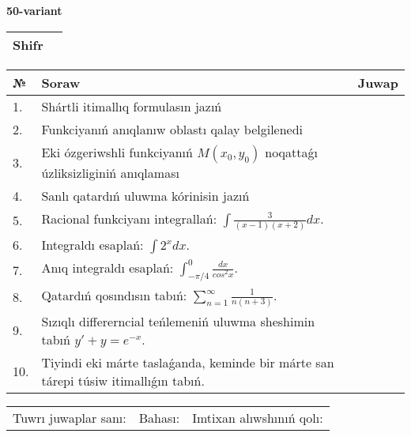 \documentclass{article}
\begin{document}
  \egroup
  
  \newpage
  
  
  \textbf{50-variant}\\
  
  \bgroup
  \def\arraystretch{1.6} %
  
  \begin{tabular}{|m{5.7cm}|m{9.5cm}|}
  \hline
  Shifr & \\
  \hline
  \end{tabular}
  
  \vspace{1cm}
  
  \begin{tabular}{|m{0.7cm}|m{10cm}|m{4cm}|}
  \hline
  № & Soraw & Juwap \\
  \hline
  1. & Shártli itimallıq formulasın jazıń &  \\
  \hline
  2. & Funkciyanıń anıqlanıw oblastı qalay belgilenedi &  \\
  \hline
  3. & Eki ózgeriwshli funkciyanıń \(M(x_{0}, y_{0})\) noqattaǵı úzliksizliginiń anıqlaması &  \\
  \hline
  4. & Sanlı qatardıń uluwma kórinisin jazıń &  \\
  \hline
  5. & Racional funkciyanı integrallań: \(\int{\frac{3}{(x - 1)(x + 2)}dx}\). &  \\
  \hline
  6. & Integraldı esaplań: \(\int{2^{x}dx}\). &  \\
  \hline
  7. & Anıq integraldı esaplań: \(\int_{- \pi/4}^{0}\frac{dx}{cos^2 x}\). &  \\
  \hline
  8. & Qatardıń qosındısın tabıń: \(\sum_{n = 1}^{\infty}\frac{1}{n(n + 3)}\). &  \\
  \hline
  9. & Sızıqlı differerncial teńlemeniń uluwma sheshimin tabıń \(y' + y = e^{- x}\). &  \\
  \hline
  10. & Tiyindi eki márte taslaǵanda, keminde bir márte san tárepi túsiw itimallıǵın tabıń. &  \\
  \hline
  \end{tabular}
  
  \vspace{1cm}
  
  \begin{tabular}{lll}
  Tuwrı juwaplar sanı: \underline{\hspace{1.5cm}} & 
  Bahası: \underline{\hspace{1.5cm}} & 
  Imtixan alıwshınıń qolı: \underline{\hspace{2cm}} \\
  \end{tabular}
  
  \egroup
  
  \newpage
  
  
\end{document}
